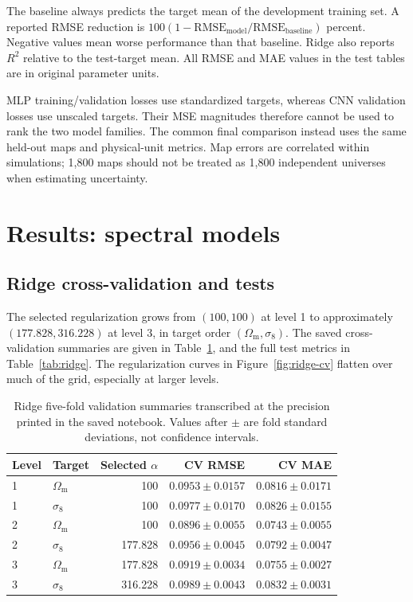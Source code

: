 \documentclass[11pt,a4paper]{article}
\newcommand{\Om}{\Omega_{\mathrm m}}
\newcommand{\sig}{\sigma_8}
\begin{document}
The baseline always predicts the target mean of the development training set. A reported RMSE reduction is $100(1-\mathrm{RMSE}_{\mathrm{model}}/\mathrm{RMSE}_{\mathrm{baseline}})$ percent. Negative values mean worse performance than that baseline. Ridge also reports $R^2$ relative to the test-target mean. All RMSE and MAE values in the test tables are in original parameter units.

MLP training/validation losses use standardized targets, whereas CNN validation losses use unscaled targets. Their MSE magnitudes therefore cannot be used to rank the two model families. The common final comparison instead uses the same held-out maps and physical-unit metrics. Map errors are correlated within simulations; 1,800 maps should not be treated as 1,800 independent universes when estimating uncertainty.

\section{Results: spectral models}
\subsection{Ridge cross-validation and tests}
The selected regularization grows from $(100,100)$ at level 1 to approximately $(177.828,316.228)$ at level 3, in target order $(\Om,\sig)$. The saved cross-validation summaries are given in Table~\ref{tab:ridge-cv}, and the full test metrics in Table~\ref{tab:ridge}. The regularization curves in Figure~\ref{fig:ridge-cv} flatten over much of the grid, especially at larger levels.

\begin{table}[htbp]\centering\small
\caption{Ridge five-fold validation summaries transcribed at the precision printed in the saved notebook. Values after $\pm$ are fold standard deviations, not confidence intervals.}\label{tab:ridge-cv}
\begin{tabular}{llrrr}
\toprule
Level & Target & Selected $\alpha$ & CV RMSE & CV MAE\\
\midrule
1 & $\Om$ & 100 & $0.0953\pm0.0157$ & $0.0816\pm0.0171$\\
1 & $\sig$ & 100 & $0.0977\pm0.0170$ & $0.0826\pm0.0155$\\
2 & $\Om$ & 100 & $0.0896\pm0.0055$ & $0.0743\pm0.0055$\\
2 & $\sig$ & 177.828 & $0.0956\pm0.0045$ & $0.0792\pm0.0047$\\
3 & $\Om$ & 177.828 & $0.0919\pm0.0034$ & $0.0755\pm0.0027$\\
3 & $\sig$ & 316.228 & $0.0989\pm0.0043$ & $0.0832\pm0.0031$\\
\bottomrule
\end{tabular}
\end{table}

\end{document}

